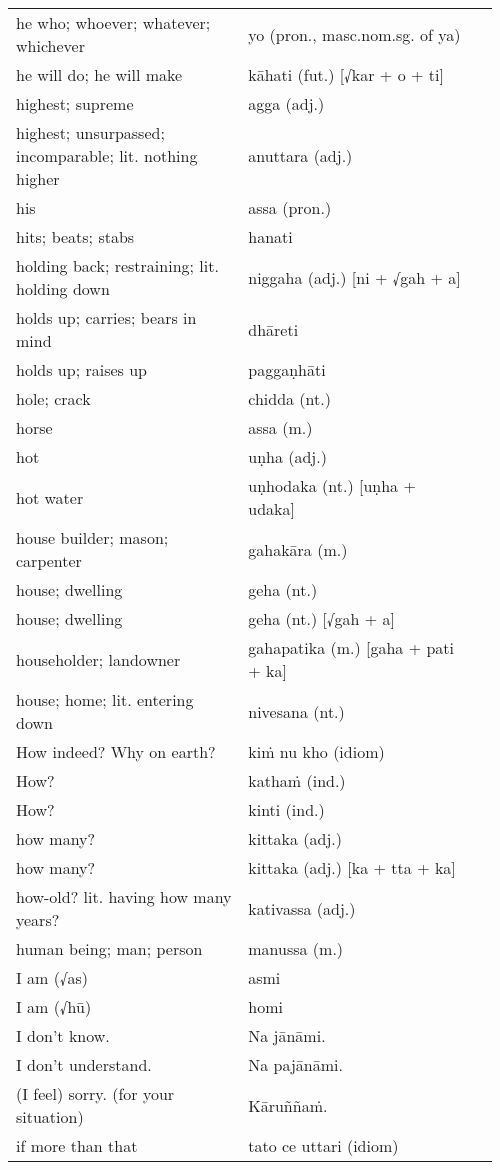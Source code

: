 \documentclass[a5paper]{memoir}
\begin{document}
\begin{longtable}{L{0.48\linewidth} L{0.48\linewidth} H}
he who; whoever; whatever; whichever & yo (pron., masc.nom.sg. of ya) & \\
he will do; he will make & kāhati (fut.) [√kar + o + ti] & \\
highest; supreme & agga (adj.) & \\
highest; unsurpassed; incomparable; lit. nothing higher & anuttara (adj.) & \\
his & assa (pron.) & \\
hits; beats; stabs & hanati & \\
holding back; restraining; lit. holding down & niggaha (adj.) [ni + √gah + a] & \\
holds up; carries; bears in mind & dhāreti & \\
holds up; raises up & paggaṇhāti & \\
hole; crack & chidda (nt.) & \\
horse & assa (m.) & \\
hot & uṇha (adj.) & \\
hot water & uṇhodaka (nt.) [uṇha + udaka] & \\
house builder; mason; carpenter & gahakāra (m.) & \\
house; dwelling & geha (nt.) & \\
house; dwelling & geha (nt.) [√gah + a] & \\
householder; landowner & gahapatika (m.) [gaha + pati + ka] & \\
house; home; lit. entering down & nivesana (nt.) & \\
How indeed? Why on earth? & kiṁ nu kho (idiom) & \\
How? & kathaṁ (ind.) & \\
How? & kinti (ind.) & \\
how many? & kittaka (adj.) & \\
how many? & kittaka (adj.) [ka + tta + ka] & \\
how-old? lit. having how many years? & kativassa (adj.) & \\
human being; man; person & manussa (m.) & \\
I am (√as) & asmi & \\
I am (√hū) & homi & \\
I don't know. & Na jānāmi. & \\
I don't understand. & Na pajānāmi. & \\
(I feel) sorry. (for your situation) & Kāruññaṁ. & \\
if more than that & tato ce uttari (idiom) & \\

\end{longtable}
\end{document}
